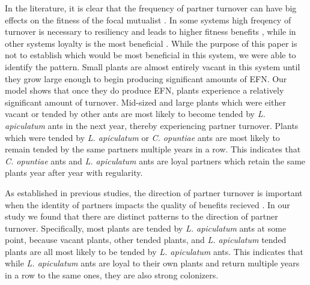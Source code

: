 \documentclass[11pt]{article}
\begin{document}
In the literature, it is clear that the frequency of partner turnover can have big effects on the fitness of the focal mutualist \cite{Fiala1994, Horvitz1986, Oliveira1999, Sachs2004}.
In some systems high freqency of turnover is necessary to resiliency and leads to higher fitness benefits \cite{Trojelsgaard2015}, while in other systems loyalty is the most beneficial \cite{Batstone2018}.
While the purpose of this paper is not to establish which would be most beneficial in this system, we were able to identify the pattern. 
Small plants are almost entirely vacant in this system until they grow large enough to begin producing significant amounts of EFN.
Our model shows that once they do produce EFN, plants experience a relatively significant amount of turnover.
Mid-sized and large plants which were either vacant or tended by other ants are most likely to become tended by \textit{L. apiculatum} ants in the next year, thereby experiencing partner turnover. 
Plants which were tended by \textit{L. apiculatum} or \textit{C. opuntiae} ants are most likely to remain tended by the same partners multiple years in a row. 
This indicates that \textit{C. opuntiae} ants and \textit{L. apiculatum} ants are loyal partners which retain the same plants year after year with regularity.


As established in previous studies, the direction of partner turnover is important when the identity of partners impacts the quality of benefits recieved \cite{Fonseca2003, Alonso1998, Dejean2008, Noe1994}.
In our study we found that there are distinct patterns to the direction of partner turnover. 
Specifically, most plants are tended by \textit{L. apiculatum} ants at some point, because vacant plants, other tended plants, and \textit{L. apiculatum} tended plants are all most likely to be tended by \textit{L. apiculatum} ants.
This indicates that while \textit{L. apiculatum} ants are loyal to their own plants and return multiple years in a row to the same ones, they are also strong colonizers. 
\end{document}
